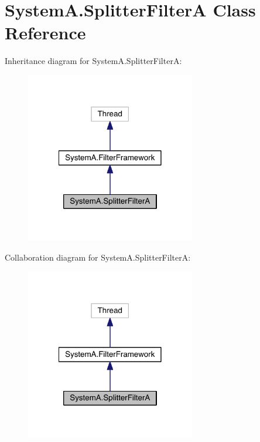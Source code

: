\hypertarget{class_system_a_1_1_splitter_filter_a}{}\section{System\+A.\+Splitter\+Filter\+A Class Reference}
\label{class_system_a_1_1_splitter_filter_a}


Inheritance diagram for System\+A.\+Splitter\+Filter\+A\+:\nopagebreak
\begin{figure}[H]
\begin{center}
\leavevmode
\includegraphics[width=210pt]{class_system_a_1_1_splitter_filter_a__inherit__graph}
\end{center}
\end{figure}


Collaboration diagram for System\+A.\+Splitter\+Filter\+A\+:\nopagebreak
\begin{figure}[H]
\begin{center}
\leavevmode
\includegraphics[width=210pt]{class_system_a_1_1_splitter_filter_a__coll__graph}
\end{center}
\end{figure}
